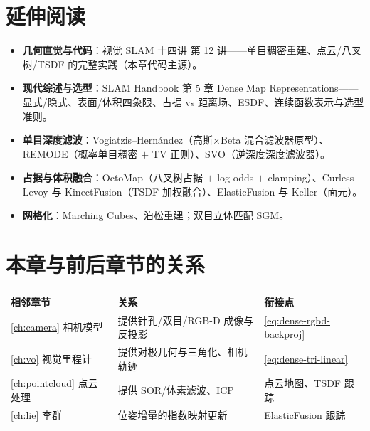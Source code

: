 \section*{延伸阅读}
\begin{itemize}
  \item \textbf{几何直觉与代码}：视觉 SLAM 十四讲\cite{gaoxiang2019slam14} 第 12 讲——单目稠密重建、点云/八叉树/TSDF 的完整实践（本章代码主源）。
  \item \textbf{现代综述与选型}：SLAM Handbook\cite{carlone2026handbook} 第 5 章 Dense Map Representations——显式/隐式、表面/体积四象限、占据 vs 距离场、ESDF、连续函数表示与选型准则。
  \item \textbf{单目深度滤波}：Vogiatzis--Hernández\cite{vogiatzis2011video}（高斯×Beta 混合滤波器原型）、REMODE\cite{pizzoli2014remode}（概率单目稠密 $+$ TV 正则）、SVO\cite{forster2017svo}（逆深度深度滤波器）。
  \item \textbf{占据与体积融合}：OctoMap\cite{hornung2013octomap}（八叉树占据 $+$ log-odds $+$ clamping）、Curless--Levoy\cite{curless1996volumetric} 与 KinectFusion\cite{newcombe2011kinectfusion}（TSDF 加权融合）、ElasticFusion\cite{whelan2015elasticfusion} 与 Keller\cite{keller2013pointfusion}（面元）。
  \item \textbf{网格化}：Marching Cubes\cite{lorensen1987marchingcubes}、泊松重建\cite{kazhdan2006poisson}；双目立体匹配 SGM\cite{hirschmuller2008sgm}。
\end{itemize}

\section*{本章与前后章节的关系}
\begin{table}[H]\centering\small
\begin{tabular}{lll}
\toprule
相邻章节 & 关系 & 衔接点 \\
\midrule
\cref{ch:camera} 相机模型 & 提供针孔/双目/RGB-D 成像与反投影 & \cref{eq:dense-rgbd-backproj} \\
\cref{ch:vo} 视觉里程计 & 提供对极几何与三角化、相机轨迹 & \cref{eq:dense-tri-linear} \\
\cref{ch:pointcloud} 点云处理 & 提供 SOR/体素滤波、ICP & 点云地图、TSDF 跟踪 \\
\cref{ch:lie} 李群 & 位姿增量的指数映射更新 & ElasticFusion 跟踪 \\
\bottomrule
\end{tabular}
\end{table}


